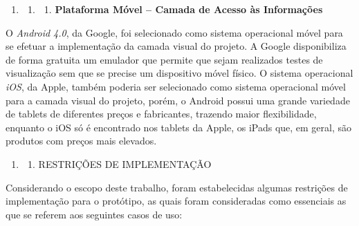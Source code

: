 \documentclass[a4paper]{article}
\newcounter{saveenum}
\newcommand\liststyleWWviiiNumi{%
\renewcommand\theenumi{\arabic{enumi}}
\renewcommand\theenumii{\arabic{enumi}.\arabic{enumii}}
\renewcommand\theenumiii{\arabic{enumi}.\arabic{enumii}.\arabic{enumiii}}
\renewcommand\theenumiv{\arabic{enumi}.\arabic{enumii}.\arabic{enumiii}.\arabic{enumiv}}
\renewcommand\labelenumi{\theenumi}
\renewcommand\labelenumii{\theenumii}
\renewcommand\labelenumiii{\theenumiii}
\renewcommand\labelenumiv{\theenumiv.}
}
\begin{document}
\bigskip

\liststyleWWviiiNumi
\begin{enumerate}
\item \begin{enumerate}
\item \begin{enumerate}
\item {
\textsf{\textbf{Plataforma M\'ovel -- Camada de Acesso \`as Informa\c{c}\~oes}}}
\end{enumerate}
\end{enumerate}
\end{enumerate}
{
\textsf{O }\textsf{\textit{Android 4.0}}\textsf{, da Google, foi selecionado como sistema operacional m\'ovel para se
efetuar a implementa\c{c}\~ao da camada visual do projeto. A Google disponibiliza de forma gratuita um emulador que
permite que sejam realizados testes de visualiza\c{c}\~ao sem que se precise um dispositivo m\'ovel f\'isico. O sistema
operacional }\textsf{\textit{iOS}}\textsf{, da Apple, tamb\'em poderia ser selecionado como sistema operacional m\'ovel
para a camada visual do projeto, por\'em, o Android possui uma grande variedade de tablets de diferentes pre\c{c}os e
fabricantes, trazendo maior flexibilidade, enquanto o iOS s\'o \'e encontrado nos tablets da Apple, os iPads que, em
geral, s\~ao produtos com pre\c{c}os mais elevados. }}


\bigskip

\liststyleWWviiiNumi
\setcounter{saveenum}{\value{enumi}}
\begin{enumerate}
\setcounter{enumi}{\value{saveenum}}
\item \setcounter{saveenum}{\value{enumii}}
\begin{enumerate}
\setcounter{enumii}{\value{saveenum}}
\item {\sffamily
RESTRI\c{C}\~OES DE IMPLEMENTA\c{C}\~AO}
\end{enumerate}
\end{enumerate}
{\sffamily
Considerando o escopo deste trabalho, foram estabelecidas algumas restri\c{c}\~oes de
\foreignlanguage{portuges}{implementa\c{c}\~ao para o prot\'otipo, as quais foram consideradas como essenciais as que
se referem aos seguintes casos de uso:}}
\end{document}
